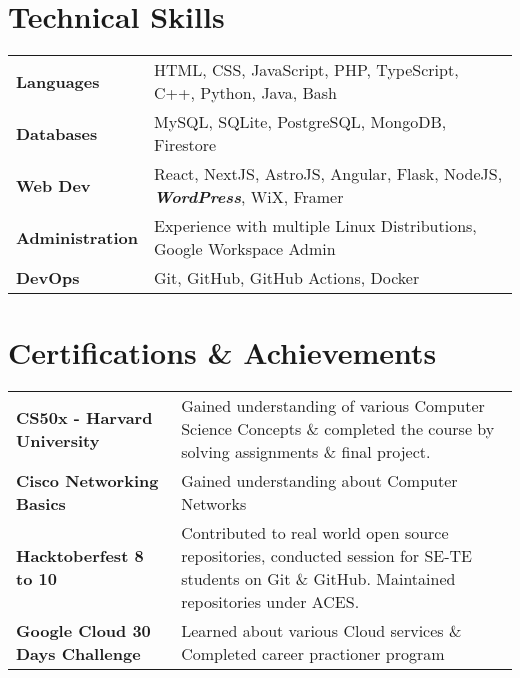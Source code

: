 \documentclass[a4paper,10pt]{article}
\begin{document}
\section{Technical Skills}
\begin{tabularx}{\linewidth}{@{}l X@{}}
\textbf{Languages} &  \normalsize{HTML, CSS, JavaScript, PHP, TypeScript, C++, Python, Java, Bash}\\
\textbf{Databases} &  \normalsize{MySQL, SQLite, PostgreSQL, MongoDB, Firestore}\\
\textbf{Web Dev}  &  \normalsize{React, NextJS, AstroJS, Angular,  Flask, NodeJS, \textbf{\textit{WordPress}}, WiX, Framer}\\
\textbf{Administration} & \normalsize{Experience with multiple Linux Distributions, Google Workspace Admin}\\
\textbf{DevOps}  &  \normalsize{Git, GitHub, GitHub Actions,  Docker}\\
\end{tabularx}


\section{Certifications \& Achievements}
\begin{tabularx}{\linewidth}{@{}l X@{}}
    \textbf{CS50x - Harvard University} & \normalsize{Gained understanding of various Computer Science Concepts \& completed the course by solving assignments \& final project.}\\
    \textbf{Cisco Networking Basics} &  \normalsize{Gained understanding about Computer Networks}\\
    \textbf{Hacktoberfest 8 to 10}  &  \normalsize{ Contributed to real world open source repositories, conducted session for SE-TE students on Git \& GitHub. Maintained repositories under ACES. }\\
    \textbf{Google Cloud 30 Days Challenge} &  \normalsize{Learned about various Cloud services \& Completed career practioner program}\\
\end{tabularx}

\vspace*{5mm}
\end{document}
